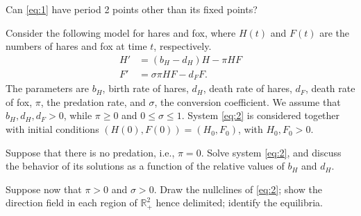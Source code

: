 \documentclass[12pt]{article}
\theoremstyle{plain}
\begin{document}
 Can \eqref{eq:1} have period 2 points other than its fixed points?


\vskip1cm
Consider the following model for hares and fox, where $H(t)$ and $F(t)$ are the numbers of hares and fox at time $t$, respectively.
\begin{equation}\label{eq:2}
\begin{aligned}
H' &= (b_H-d_H)H - \pi HF \\
F' &= \sigma\pi HF -d_FF.
\end{aligned}
\end{equation}
The parameters are $b_H$, birth rate of hares, $d_H$, death rate of hares, $d_F$, death rate of fox, $\pi$, the predation rate, and $\sigma$, the conversion coefficient. We assume that $b_H,d_H,d_F>0$, while $\pi\geq 0$ and 
$0\leq\sigma\leq 1$. System \eqref{eq:2} is considered together with initial conditions $(H(0),F(0))=(H_0,F_0)$, with $H_0,F_0>0$.

Suppose that there is no predation, i.e., $\pi=0$. Solve system \eqref{eq:2}, and discuss the behavior of its solutions as a function of the relative values of $b_H$ and $d_H$.

Suppose now that $\pi>0$ and $\sigma>0$. Draw the nullclines of \eqref{eq:2}; show the direction field in each region of $\mathbb{R}_+^2$ hence delimited; identify the equilibria.

\end{document}

